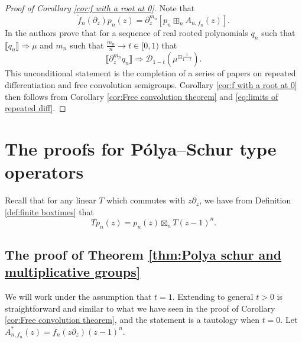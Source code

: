 \documentclass[reqno]{amsart}
\newcommand{\1}{\mathbf{1}}
\theoremstyle{plain}
\theoremstyle{definition}
\theoremstyle{remark}
\numberwithin{equation}{section}
\begin{document}
	
	\begin{proof}[Proof of Corollary \ref{cor:f with a root at 0}]
		Note that \begin{equation}
			\tilde{f}_n(\partial_z)p_n(z)=\partial_{z}^{m_n}\left[p_n\boxplus_{n} A_{n,f_n}(z)\right].
		\end{equation} In \cite[Theorem 7.7]{Arizmendi-Fujie-Perales-Ueda2024} the authors prove that for a sequence of real rooted polynomials $q_n$ such that $\llbracket q_n\rrbracket\Rightarrow\mu$ and $m_n$ such that $\frac{m_n}{n}\rightarrow t\in[0,1)$ that \begin{equation}\label{eq:limits of repeated diff}
		\llbracket\partial_z^{m_n}q_n\rrbracket\Rightarrow\mathcal{D}_{1-t}\left(\mu^{\boxplus \frac{1}{1-t}}\right).
		\end{equation} This unconditional statement is the completion of a series of papers on repeated differentiation and free convolution semigroups. 
		Corollary \ref{cor:f with a root at 0} then follows from Corollary \ref{cor:Free convolution theorem} and \eqref{eq:limits of repeated diff}.
	\end{proof}
	

	\section{The proofs for P\'olya--Schur type operators}   \label{sec:Polyaschur}
		Recall that for any linear $T$ which commutes with $z\partial_{z}$, we have from Definition \ref{def:finite boxtimes} that \begin{equation}\label{eq:multi finite free with f}
		Tp_n(z)=p_n(z)\boxtimes_{n}T(z-1)^{n}.
	\end{equation}  
	\subsection{The proof of Theorem \ref{thm:Polya schur and multiplicative groups} } 
	We will work under the assumption that $t=1$. Extending to general $t>0$ is straightforward and similar to what we have seen in the proof of Corollary \ref{cor:Free convolution theorem}, and the statement is a tautology when $t=0$. Let $A_{n,f_n}^{*}(z)=f_n(z\partial_{z})(z-1)^{n}$. 
	
\end{document}
